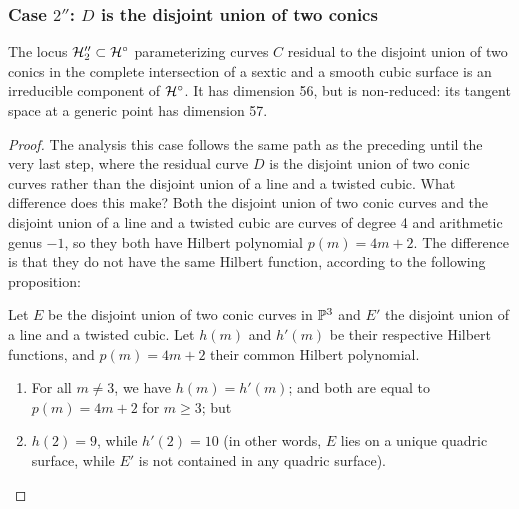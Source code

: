 \subsubsection{Case $2''$: $D$ is the disjoint union of two conics}

\begin{proposition}\label{mumford component}
The locus $\cH_{2}'' \subset \cH^\circ$ parameterizing curves $C$ residual to the disjoint union of two conics in the complete intersection of a sextic and a smooth cubic surface is an irreducible component of  $\cH^\circ$. It has dimension 56, but is non-reduced: its tangent space at
a generic point has dimension 57.
\end{proposition} 

\begin{proof}

The analysis this case follows the same path as the preceding until the very last step, where the residual curve $D$ is the disjoint union of two conic curves rather than the disjoint union of a line and a twisted cubic. What difference does this make? Both the disjoint union of two conic curves and the disjoint union of a line and a twisted cubic are curves of degree 4 and arithmetic genus $-1$, so they both have Hilbert polynomial $p(m) = 4m+2$. The difference is that they do not have the same Hilbert function, according to the following proposition:

\begin{proposition}\label{quartic curve postulation}
Let $E$ be the  disjoint union of two conic curves in $\PP^3$ and $E'$ the disjoint union of a line and a twisted cubic. Let $h(m)$ and $h'(m)$ be their respective Hilbert functions, and $p(m) = 4m+2$ their common Hilbert polynomial.
\begin{enumerate}
\item For all $m \neq 3$, we have $h(m) = h'(m)$; and both are equal to $p(m) = 4m+2$ for $m\geq 3$; but
\item $h(2) = 9$, while $h'(2) = 10$ (in other words, $E$ lies on a unique quadric surface, while $E'$ is not contained in any quadric surface).
\end{enumerate}
\end{proposition}


\end{proof}
